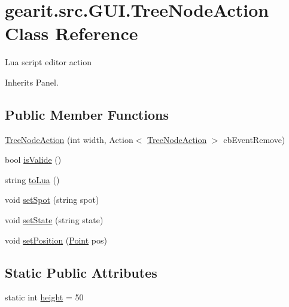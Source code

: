 \hypertarget{classgearit_1_1src_1_1_g_u_i_1_1_tree_node_action}{\section{gearit.\+src.\+G\+U\+I.\+Tree\+Node\+Action Class Reference}
\label{classgearit_1_1src_1_1_g_u_i_1_1_tree_node_action}
}


Lua script editor action  




Inherits Panel.

\subsection*{Public Member Functions}
\begin{DoxyCompactItemize}
\item 
\hyperlink{classgearit_1_1src_1_1_g_u_i_1_1_tree_node_action_a08ac1ef2127ccdeb5b38d3db4ae47684}{Tree\+Node\+Action} (int width, Action$<$ \hyperlink{classgearit_1_1src_1_1_g_u_i_1_1_tree_node_action}{Tree\+Node\+Action} $>$ cb\+Event\+Remove)
\item 
bool \hyperlink{classgearit_1_1src_1_1_g_u_i_1_1_tree_node_action_a3b180f09ca1c8ef936cb3fc3fa902a84}{is\+Valide} ()
\item 
string \hyperlink{classgearit_1_1src_1_1_g_u_i_1_1_tree_node_action_aa0fa1375ce48aa6a436443c2b658c7b1}{to\+Lua} ()
\item 
void \hyperlink{classgearit_1_1src_1_1_g_u_i_1_1_tree_node_action_ade228a11fe2afa620d1e2708bff9f436}{set\+Spot} (string spot)
\item 
void \hyperlink{classgearit_1_1src_1_1_g_u_i_1_1_tree_node_action_ac75865cca86d050b9a0e3c61b05d5a2f}{set\+State} (string state)
\item 
void \hyperlink{classgearit_1_1src_1_1_g_u_i_1_1_tree_node_action_a2baa908d047823dd92c9319964f3fa77}{set\+Position} (\hyperlink{_seidel_decomposer_8cs_a2a603daa342d957bd27dd0b1eb38af15}{Point} pos)
\end{DoxyCompactItemize}
\subsection*{Static Public Attributes}
\begin{DoxyCompactItemize}
\item 
static int \hyperlink{classgearit_1_1src_1_1_g_u_i_1_1_tree_node_action_a6f4b7d8ff4e6d4707bff8f978903bab9}{height} = 50
\end{DoxyCompactItemize}


